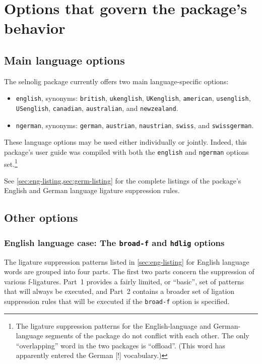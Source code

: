\documentclass[12pt]{article}
\newcommand{\pkg}[1]{\textsf{#1}}
\newcommand{\opt}[1]{\texttt{#1}}
\begin{document}
\section{Options that govern the package's behavior}

\subsection{Main language options}

The \pkg{selnolig} package currently offers two main language-specific options: 
\begin{itemize}
\item \opt{english}, synonyms: \opt{british}, \opt{ukenglish}, \opt{UKenglish}, \opt{amer\-ican},  \opt{usenglish}, \opt{USenglish}, \opt{cana\-dian}, \opt{australian}, and \opt{new\-zealand}.
\item \opt{ngerman}, synonyms: \opt{german}, \opt{austrian}, \opt{naustrian}, \opt{swiss}, and \opt{swiss\-german}.
\end{itemize}
These language options may be used either individually or jointly. Indeed, this package's user guide was compiled with both the \opt{english} and \opt{ngerman} options set.\footnote{The ligature suppression patterns for the English-language and German-language segments of the package do not conflict with each other. The only \enquote{overlapping} word in the two packages is \enquote{offload}. (This word has apparently entered the German [!] vocabulary.)}

See \cref{sec:eng-listing,sec:germ-listing} for the complete listings of the package's English and German language ligature suppression rules.



\subsection{Other options}

\subsubsection[English language case: The broad-f and hdlig options]{English language case: The \opt{broad-f} and \opt{hdlig} options} \label{sec:eng-opt}

The ligature suppression patterns listed in \cref{sec:eng-listing} for English language words are grouped into four parts. The first two parts concern the suppression of various f-ligatures. Part~1 provides a fairly limited, or \enquote{basic}, set of patterns that will always be executed, and Part~2 contains a broader set of ligation suppression rules that will be executed if the \opt{broad-f} option is specified. 
\end{document}
